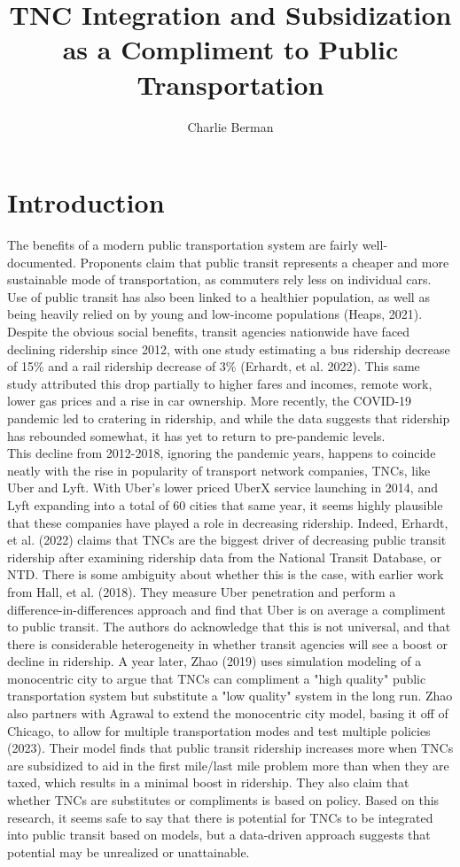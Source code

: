 \documentclass [11pt]{article}
\title{TNC Integration and Subsidization as a Compliment to Public Transportation}
\author{Charlie Berman}
\begin{document}
\maketitle

\section*{Introduction}
The benefits of a modern public transportation system are fairly well-documented. Proponents claim that public transit represents a cheaper and more sustainable mode of transportation, as commuters rely less on individual cars. Use of public transit has also been linked to a healthier population, as well as being heavily relied on by young and low-income populations (Heaps, 2021). Despite the obvious social benefits, transit agencies nationwide have faced declining ridership since 2012, with one study estimating a bus ridership decrease of 15\% and a rail ridership decrease of 3\% (Erhardt, et al. 2022). This same study attributed this drop partially to higher fares and incomes, remote work, lower gas prices and a rise in car ownership. More recently, the COVID-19 pandemic led to cratering in ridership, and while the data suggests that ridership has rebounded somewhat, it has yet to return to pre-pandemic levels.\\
\indent This decline from 2012-2018, ignoring the pandemic years, happens to coincide neatly with the rise in popularity of transport network companies, TNCs, like Uber and Lyft. With Uber's lower priced UberX service launching in 2014, and Lyft expanding into a total of 60 cities that same year, it seems highly plausible that these companies have played a role in decreasing ridership. Indeed, Erhardt, et al. (2022) claims that TNCs are the biggest driver of decreasing public transit ridership after examining ridership data from the National Transit Database, or NTD. There is some ambiguity about whether this is the case, with earlier work from Hall, et al. (2018). They measure Uber penetration and perform a difference-in-differences approach and find that Uber is on average a compliment to public transit. The authors do acknowledge that this is not universal, and that there is considerable heterogeneity in whether transit agencies will see a boost or decline in ridership. A year later, Zhao (2019) uses simulation modeling of a monocentric city to argue that TNCs can compliment a "high quality" public transportation system but substitute a "low quality" system in the long run. Zhao also partners with Agrawal to extend the monocentric city model, basing it off of Chicago, to allow for multiple transportation modes and test multiple policies (2023). Their model finds that public transit ridership increases more when TNCs are subsidized to aid in the first mile/last mile problem more than when they are taxed, which results in a minimal boost in ridership. They also claim that whether TNCs are substitutes or compliments is based on policy. Based on this research, it seems safe to say that there is potential for TNCs to be integrated into public transit based on models, but a data-driven approach suggests that potential may be unrealized or unattainable.\\
\end{document}
